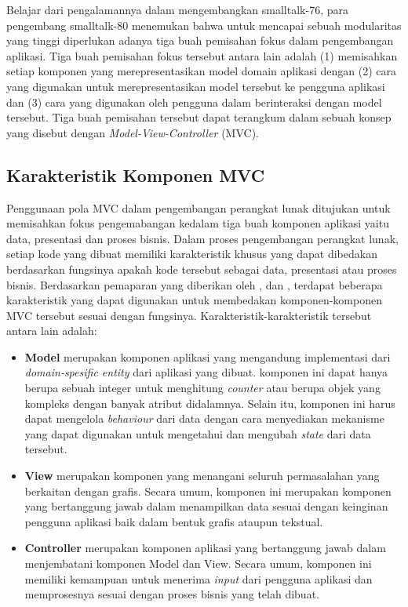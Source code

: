 Belajar dari pengalamannya dalam mengembangkan smalltalk-76, para pengembang smalltalk-80 menemukan bahwa untuk mencapai sebuah modularitas yang tinggi diperlukan adanya tiga buah pemisahan fokus dalam pengembangan aplikasi. Tiga buah pemisahan fokus tersebut antara lain adalah (1) memisahkan setiap komponen yang merepresentasikan model domain aplikasi dengan (2) cara yang digunakan untuk merepresentasikan model tersebut ke pengguna aplikasi dan (3) cara yang digunakan oleh pengguna dalam berinteraksi dengan model tersebut. Tiga buah pemisahan tersebut dapat terangkum dalam sebuah konsep yang disebut dengan \textit{Model-View-Controller} (MVC).

\subsection{Karakteristik Komponen MVC}

Penggunaan pola MVC dalam pengembangan perangkat lunak ditujukan untuk memisahkan fokus pengemabangan kedalam tiga buah komponen aplikasi yaitu data, presentasi dan proses bisnis. Dalam proses pengembangan perangkat lunak, setiap kode yang dibuat memiliki karakteristik khusus yang dapat dibedakan berdasarkan fungsinya apakah kode tersebut sebagai data, presentasi atau proses bisnis. Berdasarkan pemaparan yang diberikan oleh \cite{krasner1988desc}, \cite{leff2001web} dan \cite{burbeck1992applications}, terdapat beberapa karakteristik yang dapat digunakan untuk membedakan komponen-komponen MVC tersebut sesuai dengan fungsinya. Karakteristik-karakteristik tersebut antara lain adalah:

\begin{itemize}
    \item \textbf{Model} merupakan komponen aplikasi yang mengandung implementasi dari \textit{domain-spesific entity} dari aplikasi yang dibuat. komponen ini dapat hanya berupa sebuah integer untuk menghitung \textit{counter} atau berupa objek yang kompleks dengan banyak atribut didalamnya. Selain itu, komponen ini harus dapat mengelola  \textit{behaviour} dari data dengan cara menyediakan mekanisme yang dapat digunakan untuk mengetahui dan mengubah \textit{state} dari data tersebut.
    \item \textbf{View} merupakan komponen yang menangani seluruh permasalahan yang berkaitan dengan grafis. Secara umum, komponen ini merupakan komponen yang bertanggung jawab dalam menampilkan data sesuai dengan keinginan pengguna aplikasi baik dalam bentuk grafis ataupun tekstual.
    \item \textbf{Controller} merupakan komponen aplikasi yang bertanggung jawab dalam menjembatani komponen Model dan View. Secara umum, komponen ini memiliki kemampuan untuk menerima \textit{input} dari pengguna aplikasi dan memprosesnya sesuai dengan proses bisnis yang telah dibuat.
\end{itemize}


